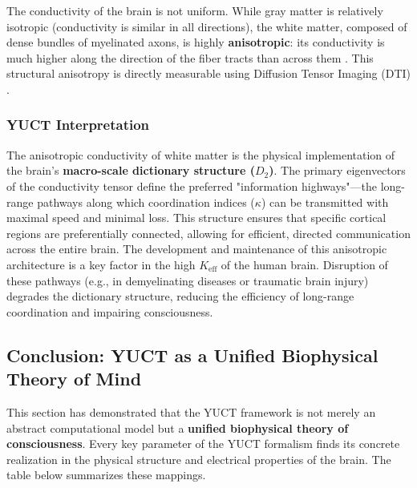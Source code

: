 \documentclass[12pt,a4paper]{article}
\begin{document}
	The conductivity of the brain is not uniform. While gray matter is relatively isotropic (conductivity is similar in all directions), the white matter, composed of dense bundles of myelinated axons, is highly \textbf{anisotropic}: its conductivity is much higher along the direction of the fiber tracts than across them \cite{Tuch2001}. This structural anisotropy is directly measurable using Diffusion Tensor Imaging (DTI) \cite{Wu2018}.
	
	\subsubsection*{YUCT Interpretation}
	The anisotropic conductivity of white matter is the physical implementation of the brain's \textbf{macro-scale dictionary structure (\(D_2\))}. The primary eigenvectors of the conductivity tensor define the preferred "information highways"—the long-range pathways along which coordination indices (\(\kappa\)) can be transmitted with maximal speed and minimal loss. This structure ensures that specific cortical regions are preferentially connected, allowing for efficient, directed communication across the entire brain. The development and maintenance of this anisotropic architecture is a key factor in the high \(K_{\mathrm{eff}}\) of the human brain. Disruption of these pathways (e.g., in demyelinating diseases or traumatic brain injury) degrades the dictionary structure, reducing the efficiency of long-range coordination and impairing consciousness.
	
	\subsection{Conclusion: YUCT as a Unified Biophysical Theory of Mind}
	
	This section has demonstrated that the YUCT framework is not merely an abstract computational model but a \textbf{unified biophysical theory of consciousness}. Every key parameter of the YUCT formalism finds its concrete realization in the physical structure and electrical properties of the brain. The table below summarizes these mappings.
	
\end{document}
